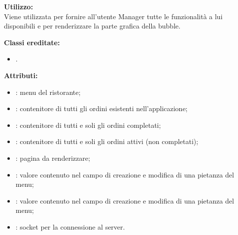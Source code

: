 \textbf{Utilizzo:}\\
Viene utilizzata per fornire all'utente Manager tutte le funzionalità a lui disponibili e per renderizzare la parte grafica della bubble.

\textbf{Classi ereditate:}
\begin{itemize}
	\item {}.
\end{itemize}
%

\textbf{Attributi:}
\begin{itemize}
	\item {}: menu del ristorante;
	\item {}: contenitore di tutti gli ordini esistenti nell'applicazione;
	\item {}: contenitore di tutti e soli gli ordini completati;
	\item {}: contenitore di tutti e soli gli ordini attivi (non completati);
	\item {}: pagina da renderizzare;
	\item {}: valore contenuto nel campo  di creazione e modifica di una pietanza del menu;
	\item {}: valore contenuto nel campo  di creazione e modifica di una pietanza del menu;
	\item {}: socket per la connessione al server.
\end{itemize}

